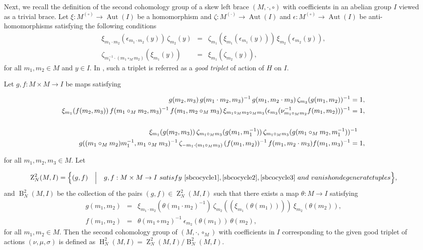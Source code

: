 \documentclass[11pt]{amsart}
\theoremstyle{thrm}
\theoremstyle{plain}
\theoremstyle{definition}
\newcommand{\B}{\operatorname{B} }
\newcommand{\Ho}{\operatorname{H} }
\newcommand{\Z}{\operatorname{Z} }
\newcommand{\Aut}{\operatorname{Aut} }
\numberwithin{equation}{section}
\begin{document}
Next, we recall the definition of the second cohomology group of a skew left brace $(M, \cdot, \circ)$ with coefficients in an abelian group $I$ viewed as a trivial brace.  Let  $\xi: M ^{(\circ)} \rightarrow \Aut (I)$ be a homomorphism and   $ \zeta: M^{(\cdot)} \rightarrow \Aut(I)$  and $\epsilon : M^{(\circ)} \rightarrow \Aut(I)$ be anti-homomorphisms satisfying the following conditions
\begin{eqnarray*}
	\xi_{m_1 \cdot m_2}(\epsilon_{m_1 \cdot m_2}(y)) \,\zeta_{m_2}(y) & = & \zeta_{m_1}(\xi_{ m_1 }(\epsilon_{m_1}(y))) \, \xi_{ m_2} (\epsilon_{m_2}(y)),\\
	\zeta_{m^{-1}_1 \cdot (m_1 \circ_M m_2)}(\xi_{m_1}(y))  & =& \xi_{m_1}(\zeta_{m_2}(y)),
\end{eqnarray*}
for all $m_1, m_2 \in M$ and $y \in I$. In \cite{NMY1}, such a triplet is referred as a  \emph{good triplet} of action of $H$ on $I$.
\par 

Let $g,f: M \times M \rightarrow I$ be maps satisfying
\begin{small}
	\begin{align} 
		g(m_2, m_3)  \,g(m_1 \cdot m_2, m_3)^{-1} \,g(m_1, m_2 \cdot m_3) \,\zeta_{m_3}( g(m_1, m_2))^{-1} =&\;  1 \label{sbcocycle1},\\
		\xi_{m_1}(f(m_2, m_3)) \, f(m_1 \circ_M m_2, m_3)^{-1} \, f(m_1, m_2 \circ_M m_3) \, \xi_{m_1 \circ_M m_2 \circ_M m_3} (\epsilon_{m_3}(\nu^{-1}_{m_1 \circ_M m_2}f(m_1, m_2)))^{-1} 	= & \;  1, \label{sbcocycle2}\\
		& \notag\\
		\xi_{m_1}(g(m_2, m_3))\, \zeta_{m_1 \circ_M m_3}(g(m_1, m^{-1}_1)) \,\zeta_{m_1 \circ_M m_3}(g(m_1 \circ_M m_2,  m^{-1}_1))^{-1} \label{sbcocycle3} \\ 
		g((m_1 \circ_M m_2) m^{-1}_1, m_1 \circ_M m_3)^{-1}\, \zeta_{- m_1\cdot (m_1 \circ_M m_3)}\, (f(m_1, m_2))^{-1} \, f(m_1, m_2 \cdot m_3)   f(m_1, m_3)^{-1} = &\; 1, \notag
	\end{align}
\end{small}
for all $m_1, m_2, m_3 \in M$.  Let

\begin{equation*}
	\Z_N^2(M, I) = \Big\{ (g ,f) \quad \Big \vert  \quad g,f:M \times M \rightarrow I ~ \textrm{satisfy}~\eqref{sbcocycle1}, \eqref{sbcocycle2}, \eqref{sbcocycle3} ~\textrm{and}~ \textrm{vanish on degenerate tuples}  \Big\},
\end{equation*}
and $\B_N^2(M, I)$ be the collection of the pairs $(g, f) \in  \Z_N^2(M, I)$ such that there exists a map $\theta:M \to I$ satisfying
\begin{eqnarray*}
	g(m_1, m_2) &=& \xi_{m_1\cdot m_2}(\theta(m_1\cdot m_2)^{-1}) ~\zeta_{m_2}((\xi_{m_1}(\theta(m_1))))~ \xi_{m_2}(\theta(m_2)),\\
	f(m_1, m_2) &=& \theta(m_1 \circ m_2)^{-1}  ~\epsilon_{m_2}(\theta(m_1)) ~ \theta(m_2),
\end{eqnarray*}
for all $m_1, m_2 \in M$.  Then the second cohomology group of  $(M, \cdot, \circ_M)$ with coefficients in $I$ corresponding to the given good triplet of actions $(\nu, \mu, \sigma)$ is defined as $\Ho^2_N(M, I) =  \Z_N^2(M, I)/\B_N^2(M, I)$.
\par 
\end{document}
